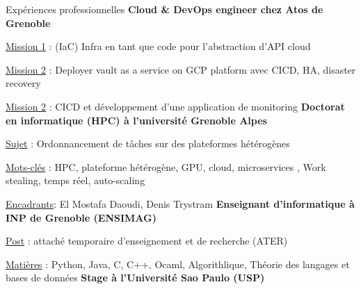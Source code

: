 
\begin{rubric}{Expériences professionnelles}
%
%
%
\entry*[]
    \textbf{Cloud \& DevOps engineer chez Atos de Grenoble} 
        \hfill {} 
    \par \underline{Mission 1} : (IaC) Infra en tant que code pour l'abstraction d'API cloud
        \hfill {}
    \par \underline{Mission 2} : Deployer vault as a service on GCP platform avec CICD, HA, disaster recovery
    \par \underline{Mission 2} : CICD et développement d'une application de monitoring
%
%
\entry*[]
    \textbf{Doctorat en informatique (HPC) à l'université Grenoble Alpes}  
    \hfill {} 
    \par \underline{Sujet} : Ordonnancement de tâches sur des plateformes hétérogènes
    \hfill {}
    \par \underline{Mots-clés} : HPC, plateforme hétérogène, GPU, cloud, microservices , Work stealing, temps réel, auto-scaling
    \par \underline{Encadrants}:  El Mostafa Daoudi, Denis Trystram
%
%
\entry*[]
    \textbf{Enseignant d'informatique à INP de Grenoble (ENSIMAG)} 
     \hfill {} 
    \par \underline{Post} : attaché temporaire d'enseignement et de recherche (ATER)
        \hfill {}
    \par \underline{Matières} : Python, Java, C, C++, Ocaml, Algorithlique, Théorie des langages et bases de données%
        \hfill {}
\entry*[]
    \textbf{Stage à l'Université Sao Paulo (USP)} %

\end{rubric}
